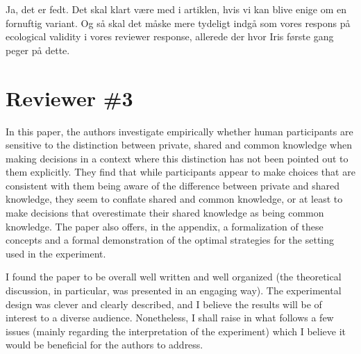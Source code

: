 \documentclass[a4paper]{article}
\newenvironment{tsn}{\smallskip \noindent \color{purple}}{\color{black}\smallskip}
\newenvironment{tobo}{\smallskip \noindent \color{yellow!80!black!80}}{\color{black}\smallskip}
\begin{document}
\begin{tsn}
\begin{tobo}
Ja, det er fedt. Det skal klart være med i artiklen, hvis vi kan blive enige om en fornuftig variant. Og så skal det måske mere tydeligt indgå som vores respons på ecological validity i vores reviewer response, allerede der hvor Iris første gang peger på dette. 
\end{tobo}

\end {tsn}


\section{Reviewer \#3}
 In this paper, the authors investigate empirically whether human participants are sensitive to the distinction between private, shared and common knowledge when making decisions in a context where this distinction has not been pointed out to them explicitly. They find that while participants appear to make choices that are consistent with them being aware of the difference between private and shared knowledge, they seem to conflate shared and common knowledge, or at least to make decisions that overestimate their shared knowledge as being common knowledge. The paper also offers, in the appendix, a formalization of these concepts and a formal demonstration of the optimal strategies for the setting used in the experiment.

I found the paper to be overall well written and well organized (the theoretical discussion, in particular, was presented in an engaging way). The experimental design was clever and clearly described, and I believe the results will be of interest to a diverse audience. Nonetheless, I shall raise in what follows a few issues (mainly regarding the interpretation of the experiment) which I believe it would be beneficial for the authors to address.
\end{document}
